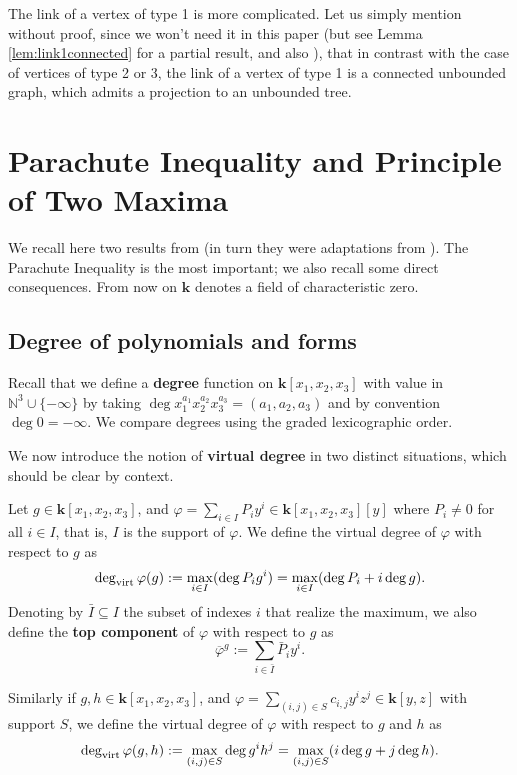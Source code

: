 \documentclass[reqno,oneside,11pt]{amsart}
\theoremstyle{plain}
\theoremstyle{definition}
\newcommand{\N}{\mathbb{N}}
\newcommand{\K}{\mathbf{k}}
\renewcommand{\phi}{\varphi}
\newcommand{\dvirt}{\deg_{\text{\rm virt}}}
\newcommand{\topcomp}[2]{\overline{#1}^{#2}}
\begin{document}
The link of a vertex of type 1 is more complicated.
Let us simply mention without proof, since we won't need it in this paper (but
see Lemma \ref{lem:link1connected} for a partial result, and also
\cite[\S3]{LP}), that in contrast with the case of vertices of type 2 or 3, the
link of a vertex of type 1 is a connected unbounded graph, which admits a
projection to an unbounded tree.

\section{Parachute Inequality and Principle of Two Maxima} \label{sec:prelim}

We recall here two results from \cite{Ku:ineq} (in turn they were adaptations from \cite{SU:ineq,SU:main}).
The Parachute Inequality is the most important; we also recall some direct consequences.
From now on $\K$ denotes a field of characteristic zero.

\subsection{Degree of polynomials and forms} \label{sec:degree polynomials}

Recall that we define a \textbf{degree} function on $\K[x_1,x_2,x_3]$ with value in $\N^3 \cup \{-\infty\}$ by taking
$\deg x_1^{a_1} x_2^{a_2} x_3^{a_3} = (a_1, a_2, a_3)$
and by convention $\deg 0 = -\infty$.
We compare degrees using the graded lexicographic order.

We now introduce the notion of \textbf{virtual degree} in two distinct situations, which should be clear by context.

Let $g \in \K[x_1,x_2,x_3]$, and $\phi = \sum_{i \in I} P_i y^i \in  \K[x_1,x_2,x_3][y]$ where $P_i \neq 0$ for all $i \in I$, that is, $I$ is the support of $\phi$.
We define the virtual degree of $\phi$ with respect to $g$ as
$$\dvirt \phi(g) := \max_{i \in I} (\deg P_i g^i) = \max_{i \in I} (\deg P_i + i \deg g).$$
Denoting by $\bar I \subseteq I$ the subset of indexes $i$ that realize the maximum, we also define the \textbf{top component} of $\phi$ with respect to $g$ as
$$\topcomp{\phi}{g} := \sum_{i \in \bar I} \bar P_i y^i.$$

Similarly if $g,h \in \K[x_1,x_2,x_3]$, and $\phi = \sum_{(i,j) \in S} c_{i,j} y^i z^j \in \K[y,z]$ with support $S$, we define the virtual degree of $\phi$ with respect to $g$ and $h$ as
$$\dvirt \phi(g,h) := \max_{(i,j) \in S} \deg g^ih^j = \max_{(i,j) \in S} (i \deg g + j \deg h).$$
\end{document}
